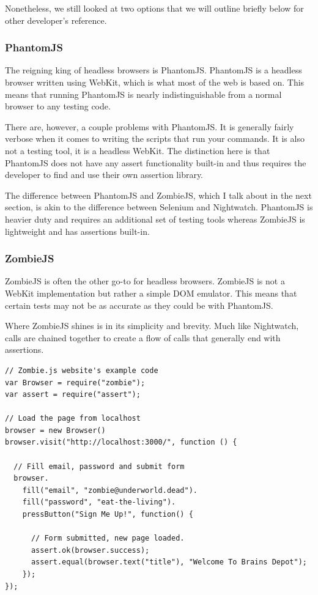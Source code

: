 \documentclass[12pt]{ucthesis}
\begin{document}
Nonetheless, we still looked at two options that we will outline briefly below for other developer's reference.

\subsubsection{PhantomJS}
The reigning king of headless browsers is PhantomJS\cite{PhantomJS}. PhantomJS is a headless browser written using WebKit, which is what most of the web is based on. This means that running PhantomJS is nearly indistinguishable from a normal browser to any testing code.

There are, however, a couple problems with PhantomJS. It is generally fairly verbose when it comes to writing the scripts that run your commands. It is also not a testing tool, it is a headless WebKit. The distinction here is that PhantomJS does not have any assert functionality built-in and thus requires the developer to find and use their own assertion library.

The difference between PhantomJS and ZombieJS, which I talk about in the next section, is akin to the difference between Selenium and Nightwatch. PhantomJS is heavier duty and requires an additional set of testing tools whereas ZombieJS is lightweight and has assertions built-in.

\subsubsection{ZombieJS}
ZombieJS\cite{ZombieJS} is often the other go-to for headless browsers. ZombieJS is not a WebKit implementation but rather a simple DOM emulator. This means that certain tests may not be as accurate as they could be with PhantomJS.

Where ZombieJS shines is in its simplicity and brevity. Much like Nightwatch, calls are chained together to create a flow of calls that generally end with assertions.

\begin{lstlisting}
// Zombie.js website's example code
var Browser = require("zombie");
var assert = require("assert");

// Load the page from localhost
browser = new Browser()
browser.visit("http://localhost:3000/", function () {

  // Fill email, password and submit form
  browser.
    fill("email", "zombie@underworld.dead").
    fill("password", "eat-the-living").
    pressButton("Sign Me Up!", function() {

      // Form submitted, new page loaded.
      assert.ok(browser.success);
      assert.equal(browser.text("title"), "Welcome To Brains Depot");
    });
});
\end{lstlisting}
\end{document}
